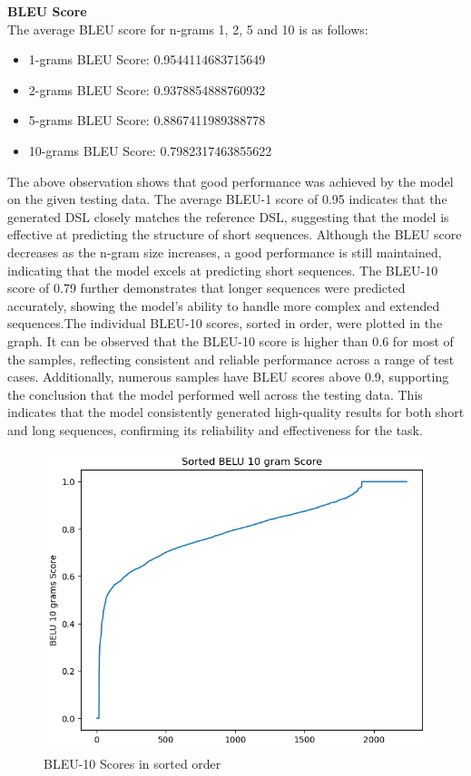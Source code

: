 \textbf{BLEU Score}\\
The average BLEU score for n-grams 1, 2, 5 and 10 is as follows:
\begin{itemize}
    \item 1-grams BLEU Score: 0.9544114683715649
\item 2-grams BLEU Score: 0.9378854888760932
\item 5-grams BLEU Score: 0.8867411989388778
\item 10-grams BLEU Score: 0.7982317463855622
\end{itemize}
The above observation shows that good performance was achieved by the model on the given testing data. The average BLEU-1 score of 0.95 indicates that the generated DSL closely matches the reference DSL, suggesting that the model is effective at predicting the structure of short sequences. Although the BLEU score decreases as the n-gram size increases, a good performance is still maintained, indicating that the model excels at predicting short sequences. The BLEU-10 score of 0.79 further demonstrates that longer sequences were predicted accurately, showing the model’s ability to handle more complex and extended sequences.The individual BLEU-10 scores, sorted in order, were plotted in the graph. It can be observed that the BLEU-10 score is higher than 0.6 for most of the samples, reflecting consistent and reliable performance across a range of test cases. Additionally, numerous samples have BLEU scores above 0.9, supporting the conclusion that the model performed well across the testing data. This indicates that the model consistently generated high-quality results for both short and long sequences, confirming its reliability and effectiveness for the task.
 \begin{figure}[H]
        \includegraphics[scale=.8]{images/bleu in sorted order.png}
        \caption{BLEU-10 Scores in sorted order}
        \label{fig:bleu10}
    \end{figure}       
